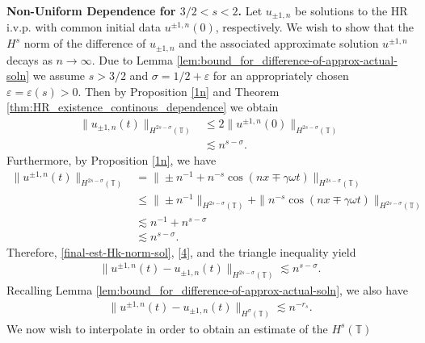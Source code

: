 \documentclass[12pt,reqno]{amsart}
\newcommand{\ci}{\mathbb{T}}
\newcommand{\ee}{\varepsilon}
\theoremstyle{plain}  %
\theoremstyle{definition}
\begin{document}
%
%
%
%
{\bf Non-Uniform Dependence for $3/2<s<2$.}
%
%
%
Let $u_{\pm 1, n}$ be solutions to the HR i.v.p. with common initial data $u^{\pm 1,
n}(0)$, respectively.
We wish to show that the $H^s$ norm of the difference of $u_{\pm 1,
n}$ and the associated approximate solution $u^{\pm 1, n}$
decays as $n \to \infty$. Due to Lemma
\ref{lem:bound_for_difference-of-approx-actual-soln} we assume
$s > 3/2 $ and $\sigma = 1/2 + \ee$ for an appropriately
chosen $\ee= \ee(s) > 0$. Then by Proposition \ref{1n} and
Theorem \ref{thm:HR_existence_continous_dependence}
we obtain
\begin{equation}
	\begin{split}
		\|u_{\pm 1, n} (t) \|_{H^{2s - \sigma}(\ci)}
		& \le 2 \|u^{\pm 1, n}(0) \|_{H^{2s - \sigma}(\ci)}
		\\
		& \lesssim n^{s- \sigma}.
			\label{final-est-Hk-norm-sol}
	\end{split}
\end{equation}
Furthermore, by Proposition \ref{1n}, we have
\begin{equation}
	\begin{split}
		\|u^{\pm 1, n} (t) \|_{H^{2s - \sigma} (\ci)}
		& = \|\pm n^{-1} + n^{-s} \cos(nx \mp \gamma \omega t) \|_{H^{2s - \sigma}(\ci)}
		\\
		& \le \| \pm n^{-1} \|_{H^{2s - \sigma}(\ci)} +
		\|n^{-s} \cos(nx \mp \gamma \omega
		t) \|_{H^{2s - \sigma}(\ci)}
		\\
		& \lesssim n^{-1} + n^{s-\sigma}
		\\
		& \lesssim n^{s-\sigma}.
		\label{4}
	\end{split}
\end{equation}
		Therefore, \eqref{final-est-Hk-norm-sol}, \eqref{4}, and the triangle
		inequality yield
		\begin{equation}
			\begin{split}
				\|u^{\pm 1, n} (t) - u_{\pm 1, n}(t)\|_{H^{2s - \sigma}(\ci)}
				\lesssim n^{s-\sigma}.
				\label{5h}
			\end{split}
		\end{equation}
		Recalling
		Lemma \ref{lem:bound_for_difference-of-approx-actual-soln}, we also
		have
		\begin{equation}
			\begin{split}
				\|u^{\pm 1, n}(t) - u_{\pm 1, n} (t) \|_{H^\sigma (\ci)} 
				\lesssim n^{-r_s}
				\label{6h}.
			\end{split}
		\end{equation}
		We now wish to interpolate in order to obtain an estimate of the $H^s (\ci)$
\end{document}
